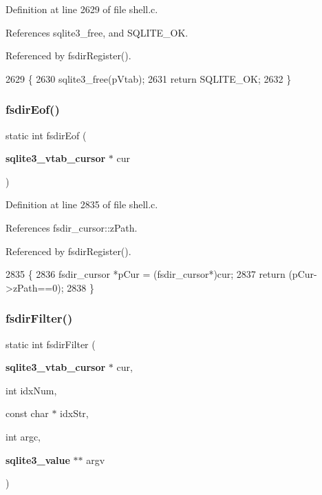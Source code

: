 Definition at line 2629 of file shell.\+c.



References sqlite3\+\_\+free, and S\+Q\+L\+I\+T\+E\+\_\+\+OK.



Referenced by fsdir\+Register().


\begin{DoxyCode}
2629                                                \{
2630   sqlite3_free(pVtab);
2631   \textcolor{keywordflow}{return} SQLITE_OK;
2632 \}
\end{DoxyCode}
\mbox{\label{shell_8c_ae8f61901508c57fda59ff5189521fbde}} 
\subsubsection{fsdir\+Eof()}
{\footnotesize\ttfamily static int fsdir\+Eof (\begin{DoxyParamCaption}\item[{\textbf{ sqlite3\+\_\+vtab\+\_\+cursor} $\ast$}]{cur }\end{DoxyParamCaption})\hspace{0.3cm}{\ttfamily [static]}}



Definition at line 2835 of file shell.\+c.



References fsdir\+\_\+cursor\+::z\+Path.



Referenced by fsdir\+Register().


\begin{DoxyCode}
2835                                              \{
2836   fsdir_cursor *pCur = (fsdir_cursor*)cur;
2837   \textcolor{keywordflow}{return} (pCur->zPath==0);
2838 \}
\end{DoxyCode}
\mbox{\label{shell_8c_a4391d1eb32b553785589b2cb67ec61c2}} 
\subsubsection{fsdir\+Filter()}
{\footnotesize\ttfamily static int fsdir\+Filter (\begin{DoxyParamCaption}\item[{\textbf{ sqlite3\+\_\+vtab\+\_\+cursor} $\ast$}]{cur,  }\item[{int}]{idx\+Num,  }\item[{const char $\ast$}]{idx\+Str,  }\item[{int}]{argc,  }\item[{\textbf{ sqlite3\+\_\+value} $\ast$$\ast$}]{argv }\end{DoxyParamCaption})\hspace{0.3cm}{\ttfamily [static]}}



